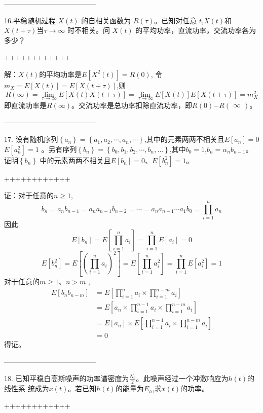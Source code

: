 \documentclass[utf8]{article}
\begin{document}
---------------------------------------

16.平稳随机过程 $X(t)$ 的自相关函数为 $R(\tau)$。已知对任意 $t$,$X(t)$和 $X(t+\tau)$当$\tau\to\infty$ 时不相关。问 $X(t)$ 的平均功率，直流功率，交流功率各为多少？

++++++++++++

解：$X(t)$的平均功率是$E\left [ X^2\left ( t\right ) \right ] = R\left ( 0\right )$, 令 $m_X= E\left [ X\left ( t\right ) \right ] = E\left [ X\left ( t+ \tau \right ) \right ]$,则
$$R\left(\infty\right)=\lim_{\tau\to\infty}E\left[X\left(t\right)X\left(t+\tau\right)\right]=\lim_{\tau\to\infty}E\left[X\left(t\right)\right]E\left[X\left(t+\tau\right)\right]=m_X^2$$
即直流功率是$R(\infty)$。交流功率是总功率扣除直流功率，即$R(0)\boldsymbol{-}R\begin{pmatrix}\infty\end{pmatrix}$。

---------------------------------------

17. 设有随机序列$\left\{a_n\right\}=\left\{a_1,a_2,\cdots,a_n,\cdots\right\}$,其中的元素两两不相关且$E[a_n]=0$
$E\left[a_n^2\right]=1$ 。另有序列$\left\{b_n\right\}=\left\{b_0,b_1,b_2,\cdots,b_n,...\right\}$,其中$b_0=1$,$b_n=\alpha_nb_{n-1}$。证明$\left\{b_n\right\}$
中的元素两两不相关且$E[b_n]=0$、$E[b_n^2]=1$。

++++++++++++

证：对于任意的$n\geq1$,
$$b_n=a_nb_{n-1}=a_na_{n-1}b_{n-2}=\cdots=a_na_{n-1}\cdots a_1b_0=\prod_{i=1}^na_n$$
因此
$$E[b_n]=E\left[\prod_{i=1}^na_i\right]=\prod_{i=1}^nE[a_i]=0$$
$$E\left[b_n^2\right]=E\left[\left(\prod_{i=1}^na_i\right)^2\right]=E\left[\prod_{i=1}^na_i^2\right]=\prod_{i=1}^nE\left[a_i^2\right]=1$$
对于任意的$m\geq1$、$n>m$ ,
$$\begin{aligned}E\left[b_nb_{n-m}\right]&=E\left[\prod_{i=1}^na_i\times\prod_{i=1}^{n-m}a_i\right]\\&=E\left[a_n\times\prod_{i=1}^{n-1}a_i\times\prod_{i=1}^{n-m}a_i\right]\\&=E[a_n]\times E\left[\prod_{i=1}^{n-1}a_i\times\prod_{i=1}^{n-m}a_i\right]\\&=0\end{aligned}$$
得证。

---------------------------------------

18. 已知平稳白高斯噪声的功率谱密度为$\frac{N_0}2$。此噪声经过一个冲激响应为$h(t)$的线性系
统成为$x(t)$。若已知$h(t)$的能量为$E_h$,求$x(t)$的功率。

++++++++++++
\end{document}
